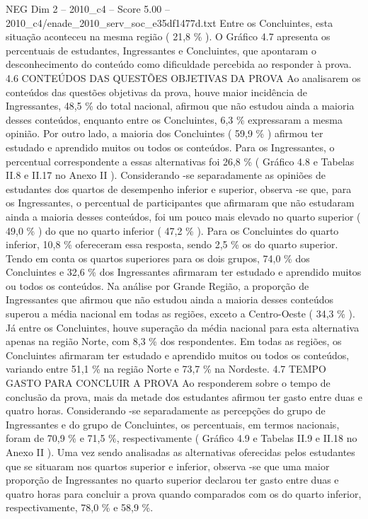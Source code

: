 \begin{textsample}{NEG Dim 2 – 2010\_c4 – Score 5.00 – 2010\_c4/enade\_2010\_serv\_soc\_e35df1477d.txt}
Entre os Concluintes, esta situação aconteceu na mesma região ( 21,8 \% ).
O Gráfico 4.7 apresenta os percentuais de estudantes, Ingressantes e Concluintes, que apontaram o desconhecimento do conteúdo como dificuldade percebida ao responder à prova. 4.6 CONTEÚDOS DAS QUESTÕES OBJETIVAS DA PROVA Ao analisarem os conteúdos das questões objetivas da prova, houve maior incidência de Ingressantes, 48,5 \% do total nacional, afirmou que não estudou ainda a maioria desses conteúdos, enquanto entre os Concluintes, 6,3 \% expressaram a mesma opinião.
Por outro lado, a maioria dos Concluintes ( 59,9 \% ) afirmou ter estudado e aprendido muitos ou todos os conteúdos.
Para os Ingressantes, o percentual correspondente a essas alternativas foi 26,8 \% ( Gráfico 4.8 e Tabelas II.8 e II.17 no Anexo II ).
Considerando -se separadamente as opiniões de estudantes dos quartos de desempenho inferior e superior, observa -se que, para os Ingressantes, o percentual de participantes que afirmaram que não estudaram ainda a maioria desses conteúdos, foi um pouco mais elevado no quarto superior ( 49,0 \% ) do que no quarto inferior ( 47,2 \% ).
Para os Concluintes do quarto inferior, 10,8 \% ofereceram essa resposta, sendo 2,5 \% os do quarto superior.
Tendo em conta os quartos superiores para os dois grupos, 74,0 \% dos Concluintes e 32,6 \% dos Ingressantes afirmaram ter estudado e aprendido muitos ou todos os conteúdos.
Na análise por Grande Região, a proporção de Ingressantes que afirmou que não estudou ainda a maioria desses conteúdos superou a média nacional em todas as regiões, exceto a Centro-Oeste ( 34,3 \% ).
Já entre os Concluintes, houve superação da média nacional para esta alternativa apenas na região Norte, com 8,3 \% dos respondentes.
Em todas as regiões, os Concluintes afirmaram ter estudado e aprendido muitos ou todos os conteúdos, variando entre 51,1 \% na região Norte e 73,7 \% na Nordeste. 4.7 TEMPO GASTO PARA CONCLUIR A PROVA Ao responderem sobre o tempo de conclusão da prova, mais da metade dos estudantes afirmou ter gasto entre duas e quatro horas.
Considerando -se separadamente as percepções do grupo de Ingressantes e do grupo de Concluintes, os percentuais, em termos nacionais, foram de 70,9 \% e 71,5 \%, respectivamente ( Gráfico 4.9 e Tabelas II.9 e II.18 no Anexo II ).
Uma vez sendo analisadas as alternativas oferecidas pelos estudantes que se situaram nos quartos superior e inferior, observa -se que uma maior proporção de Ingressantes no quarto superior declarou ter gasto entre duas e quatro horas para concluir a prova quando comparados com os do quarto inferior, respectivamente, 78,0 \% e 58,9 \%.

\end{textsample}
